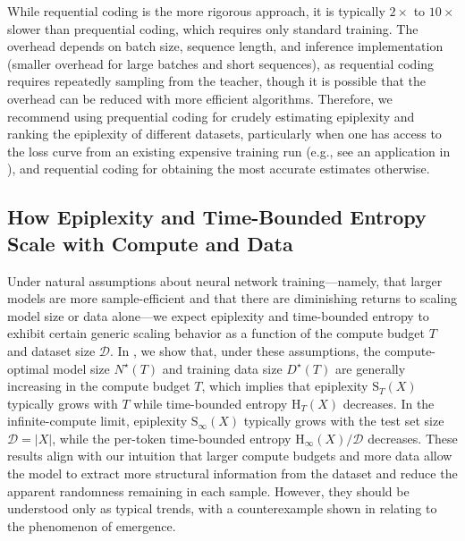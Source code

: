 \documentclass[twoside]{article}
\newcommand{\D}{\mathcal{D}}
\newcommand{\rH}{\mathrm{H}}
\newcommand{\rS}{\mathrm{S}}
\begin{document}
While requential coding is the more rigorous approach, it is typically $2\times$ to $10\times$ slower than prequential coding, which requires only standard training. The overhead depends on batch size, sequence length, and inference implementation (smaller overhead for large batches and short sequences), as requential coding requires repeatedly sampling from the teacher, though it is possible that the overhead can be reduced with more efficient algorithms. Therefore, we recommend using prequential coding for crudely estimating epiplexity and ranking the epiplexity of different datasets, particularly when one has access to the loss curve from an existing expensive training run (e.g., see an application in ), and requential coding for obtaining the most accurate estimates otherwise.

\subsection{How Epiplexity and Time-Bounded Entropy Scale with Compute and Data}
Under natural assumptions about neural network training—namely, that larger models are more sample-efficient and that there are diminishing returns to scaling model size or data alone—we expect epiplexity and time-bounded entropy to exhibit certain generic scaling behavior as a function of the compute budget $T$ and dataset size $\D$. In , we show that, under these assumptions, the compute-optimal model size $N^\star(T)$ and training data size $D^\star(T)$ are generally increasing in the compute budget $T$, which implies that epiplexity $\rS_T(X)$ typically grows with $T$ while time-bounded entropy $\rH_T(X)$ decreases. In the infinite-compute limit, epiplexity $\rS_\infty(X)$ typically grows with the test set size $\D = |X|$, while the per-token time-bounded entropy $\rH_\infty(X)/\D$ decreases. These results align with our intuition that larger compute budgets and more data allow the model to extract more structural information from the dataset and reduce the apparent randomness remaining in each sample. However, they should be understood only as typical trends, with a counterexample shown in  relating to the phenomenon of emergence.

%
%


%



%

%
%
%
%
%
%
%
%
%


%
\end{document}
